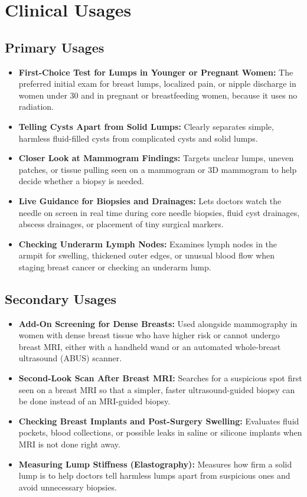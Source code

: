 \section{Clinical Usages}

\subsection{Primary Usages}
\begin{itemize}
\item \textbf{First-Choice Test for Lumps in Younger or Pregnant Women:} The preferred initial exam for breast lumps, localized pain, or nipple discharge in women under 30 and in pregnant or breastfeeding women, because it uses no radiation.
\item \textbf{Telling Cysts Apart from Solid Lumps:} Clearly separates simple, harmless fluid-filled cysts from complicated cysts and solid lumps.
\item \textbf{Closer Look at Mammogram Findings:} Targets unclear lumps, uneven patches, or tissue pulling seen on a mammogram or 3D mammogram to help decide whether a biopsy is needed.
\item \textbf{Live Guidance for Biopsies and Drainages:} Lets doctors watch the needle on screen in real time during core needle biopsies, fluid cyst drainages, abscess drainages, or placement of tiny surgical markers.
\item \textbf{Checking Underarm Lymph Nodes:} Examines lymph nodes in the armpit for swelling, thickened outer edges, or unusual blood flow when staging breast cancer or checking an underarm lump.
\end{itemize}

\subsection{Secondary Usages}
\begin{itemize}
\item \textbf{Add-On Screening for Dense Breasts:} Used alongside mammography in women with dense breast tissue who have higher risk or cannot undergo breast MRI, either with a handheld wand or an automated whole-breast ultrasound (ABUS) scanner.
\item \textbf{Second-Look Scan After Breast MRI:} Searches for a suspicious spot first seen on a breast MRI so that a simpler, faster ultrasound-guided biopsy can be done instead of an MRI-guided biopsy.
\item \textbf{Checking Breast Implants and Post-Surgery Swelling:} Evaluates fluid pockets, blood collections, or possible leaks in saline or silicone implants when MRI is not done right away.
\item \textbf{Measuring Lump Stiffness (Elastography):} Measures how firm a solid lump is to help doctors tell harmless lumps apart from suspicious ones and avoid unnecessary biopsies.
\end{itemize}

